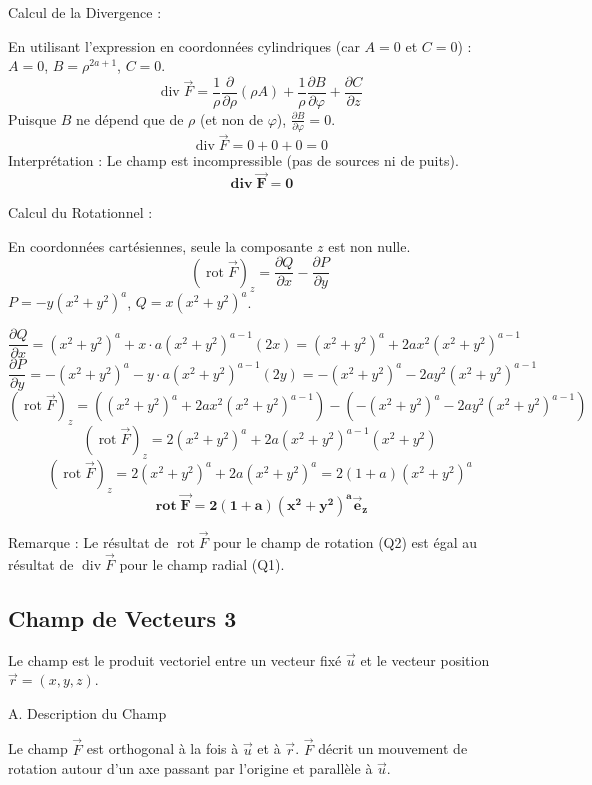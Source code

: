 \documentclass[french]{yLectureNote}
\renewcommand{\vec}{\overrightarrow}
\begin{document}
Calcul de la Divergence :

    En utilisant l'expression en coordonnées cylindriques (car $A=0$ et $C=0$) :
    $A = 0$, $B = \rho^{2a+1}$, $C = 0$.
    $$
    \operatorname{div}\vec{F} = \frac{1}{\rho}\frac{\partial}{\partial\rho}(\rho A) + \frac{1}{\rho}\frac{\partial B}{\partial\varphi} + \frac{\partial C}{\partial z}
    $$
    Puisque $B$ ne dépend que de $\rho$ (et non de $\varphi$), $\frac{\partial B}{\partial\varphi} = 0$.
    $$
    \operatorname{div}\vec{F} = 0 + 0 + 0 = 0
    $$
    Interprétation : Le champ est incompressible (pas de sources ni de puits).
    $$
    \mathbf{\operatorname{div}\vec{F} = 0}
    $$

Calcul du Rotationnel :

    En coordonnées cartésiennes, seule la composante $z$ est non nulle.
    $$
    (\operatorname{rot}\vec{F})_z = \frac{\partial Q}{\partial x} - \frac{\partial P}{\partial y}
    $$
    $P = -y(x^2+y^2)^a$, $Q = x(x^2+y^2)^a$.

    $$
    \frac{\partial Q}{\partial x} = (x^2+y^2)^a + x \cdot a(x^2+y^2)^{a-1}(2x) = (x^2+y^2)^a + 2ax^2(x^2+y^2)^{a-1}
    $$
    $$
    \frac{\partial P}{\partial y} = -(x^2+y^2)^a - y \cdot a(x^2+y^2)^{a-1}(2y) = -(x^2+y^2)^a - 2ay^2(x^2+y^2)^{a-1}
    $$
    $$
    (\operatorname{rot}\vec{F})_z = \left( (x^2+y^2)^a + 2ax^2(x^2+y^2)^{a-1} \right) - \left( -(x^2+y^2)^a - 2ay^2(x^2+y^2)^{a-1} \right)
    $$
    $$
    (\operatorname{rot}\vec{F})_z = 2(x^2+y^2)^a + 2a(x^2+y^2)^{a-1}(x^2+y^2)
    $$
    $$
    (\operatorname{rot}\vec{F})_z = 2(x^2+y^2)^a + 2a(x^2+y^2)^a = 2(1+a)(x^2+y^2)^a
    $$
    $$
    \mathbf{\operatorname{rot}\vec{F} = 2(1+a)(x^2+y^2)^a \vec{e}_z}
    $$

    Remarque : Le résultat de $\operatorname{rot}\vec{F}$ pour le champ de rotation (Q2) est égal au résultat de $\operatorname{div}\vec{F}$ pour le champ radial (Q1).

\subsection{Champ de Vecteurs 3}

Le champ est le produit vectoriel entre un vecteur fixé $\vec{u}$ et le vecteur position $\vec{r}=(x,y,z)$.

A. Description du Champ

Le champ $\vec{F}$ est orthogonal à la fois à $\vec{u}$ et à $\vec{r}$. $\vec{F}$ décrit un mouvement de rotation autour d'un axe passant par l'origine et parallèle à $\vec{u}$.
\end{document}
